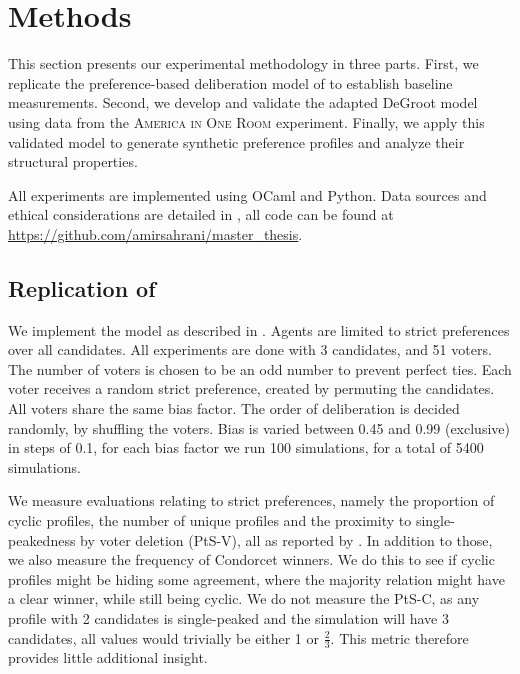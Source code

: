 \chapter{Methods}
\label{Methods}



This section presents our experimental methodology in three parts. First, we
replicate the preference-based deliberation model of
\citet{radDeliberationSinglePeakednessCoherent2021} to establish baseline
measurements. Second, we develop and validate the adapted DeGroot model using
data from the \textsc{America in One Room} experiment. Finally, we apply this validated
model to generate synthetic preference profiles and analyze their structural
properties.

All experiments are
implemented using OCaml and Python. Data sources and ethical considerations are
detailed in , all code can be found at \url{https://github.com/amirsahrani/master_thesis}.


\section{Replication of \citet{radDeliberationSinglePeakednessCoherent2021}}

We implement the model as described in . Agents are
limited to strict preferences over all candidates. All experiments are done with
3 candidates, and 51 voters. The number of voters is chosen to be an odd number
to prevent perfect ties. Each voter receives a random strict preference, created
by permuting the candidates. All voters share the same bias factor. The order of
deliberation is decided randomly, by shuffling the voters. Bias is varied
between 0.45 and 0.99 (exclusive) in steps of 0.1, for each bias factor we run 100
simulations, for a total of 5400 simulations.


We measure evaluations relating to strict preferences, namely the
proportion of cyclic profiles, the number of unique profiles and the proximity
to single-peakedness by voter deletion (PtS-V), all as reported by
\citet{radDeliberationSinglePeakednessCoherent2021}. In addition to those, we
also measure the frequency of Condorcet winners. We do this to see if cyclic
profiles might be hiding some agreement, where the majority relation might have a clear winner, while still being cyclic. We do not measure the PtS-C, as any
profile with 2 candidates is single-peaked and the simulation will have 3
candidates, all values would trivially be either 1 or $\frac{2}{3}$.  This metric therefore
provides little additional insight.

